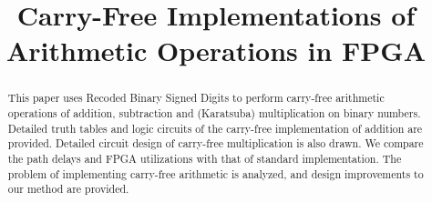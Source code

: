 \documentclass[conference]{IEEEtran}
\begin{document}
%
\title{Carry-Free Implementations of Arithmetic Operations in FPGA}


\author{
}


% 


\maketitle

\begin{abstract}
This paper uses Recoded Binary Signed Digits to perform carry-free arithmetic operations of addition, subtraction and (Karatsuba) multiplication on binary numbers. Detailed truth tables and logic circuits of the carry-free implementation of addition are provided. Detailed circuit design of carry-free multiplication is also drawn. We compare the path delays and FPGA utilizations with that of standard implementation. The problem of implementing carry-free arithmetic is analyzed, and design improvements to our method are provided.
\end{abstract}
\end{document}

